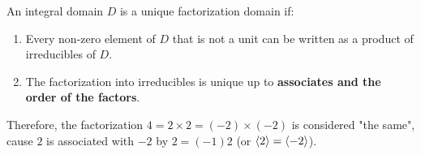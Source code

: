 \documentclass[../main.tex]{subfiles}
\begin{document}
\begin{definition}
  An integral domain $D$ is a unique factorization domain if:
  \begin{enumerate}
    \item Every non-zero element of $D$ that is not a unit can be written
          as a product of irreducibles of $D$.
    \item The factorization into irreducibles is unique
          up to \textbf{associates and the order of the factors}.
  \end{enumerate}
\end{definition}

Therefore, the factorization $4 = 2 \times 2 = (-2) \times (-2)$ is considered "the same", cause
$2$ is associated with $-2$ by $2 = (-1) 2$ (or $\langle 2 \rangle = \langle -2 \rangle$).
\end{document}
